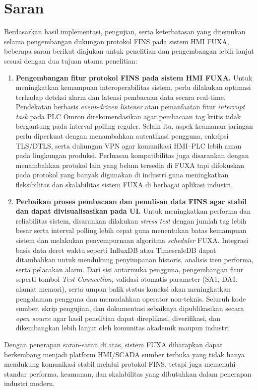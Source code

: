 \section{Saran}
Berdasarkan hasil implementasi, pengujian, serta keterbatasan yang ditemukan selama pengembangan dukungan protokol FINS pada sistem HMI FUXA, beberapa saran berikut diajukan untuk penelitian dan pengembangan lebih lanjut sesuai dengan dua tujuan utama penelitian:

\begin{enumerate}
    \item \textbf{Pengembangan fitur protokol FINS pada sistem HMI FUXA.}  
    Untuk meningkatkan kemampuan interoperabilitas sistem, perlu dilakukan optimasi terhadap deteksi alarm dan latensi pembacaan data secara real-time. Pendekatan berbasis \textit{event-driven listener} atau pemanfaatan fitur \textit{interrupt task} pada PLC Omron direkomendasikan agar pembacaan tag kritis tidak bergantung pada interval polling reguler.  
    Selain itu, aspek keamanan jaringan perlu diperkuat dengan menambahkan autentikasi pengguna, enkripsi TLS/DTLS, serta dukungan VPN agar komunikasi HMI–PLC lebih aman pada lingkungan produksi.  
    Perluasan kompatibilitas juga disarankan dengan menambahkan protokol lain yang belum tersedia di FUXA tapi difokuskan pada protokol yang banyak digunakan di industri guna meningkatkan fleksibilitas dan skalabilitas sistem FUXA di berbagai aplikasi industri.

    \item \textbf{Perbaikan proses pembacaan dan penulisan data FINS agar stabil dan dapat divisualisasikan pada UI.}  
    Untuk meningkatkan performa dan reliabilitas sistem, disarankan dilakukan \textit{stress test} dengan jumlah tag lebih besar serta interval polling lebih cepat guna menentukan batas kemampuan sistem dan melakukan penyempurnaan algoritma \textit{scheduler} FUXA.  
    Integrasi basis data deret waktu seperti InfluxDB atau TimescaleDB dapat ditambahkan untuk mendukung penyimpanan historis, analisis tren performa, serta pelacakan alarm.  
    Dari sisi antarmuka pengguna, pengembangan fitur seperti tombol \textit{Test Connection}, validasi otomatis parameter (SA1, DA1, alamat memori), serta umpan balik status koneksi akan meningkatkan pengalaman pengguna dan memudahkan operator non-teknis.  
    Seluruh kode sumber, skrip pengujian, dan dokumentasi sebaiknya dipublikasikan secara \textit{open source} agar hasil penelitian dapat direplikasi, diverifikasi, dan dikembangkan lebih lanjut oleh komunitas akademik maupun industri.

\end{enumerate}

Dengan penerapan saran-saran di atas, sistem FUXA diharapkan dapat berkembang menjadi platform HMI/SCADA sumber terbuka yang tidak hanya mendukung komunikasi stabil melalui protokol FINS, tetapi juga memenuhi standar performa, keamanan, dan skalabilitas yang dibutuhkan dalam penerapan industri modern.

\cleardoublepage
